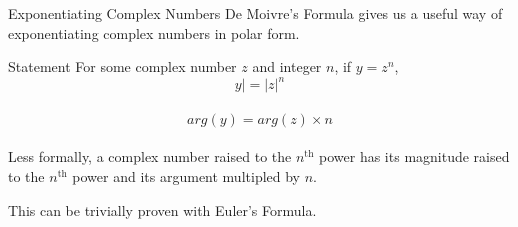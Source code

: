 \begin{namedframe}{Exponentiating Complex Numbers}
	De Moivre's Formula gives us a useful way of exponentiating complex numbers in polar form.
	\begin{block}{Statement}
		For some complex number $z$ and integer $n$, if $y = z^n$, \\ 
		\[y| = |z|^n\] \\
		\[arg(y) = arg(z) \times n\] \\
		Less formally, a complex number raised to the $n^{\text{th}}$ power has its magnitude
		raised to the $n^{\text{th}}$ power and its argument multipled by $n$.
	\end{block}

	This can be trivially proven with Euler's Formula.
\end{namedframe}
